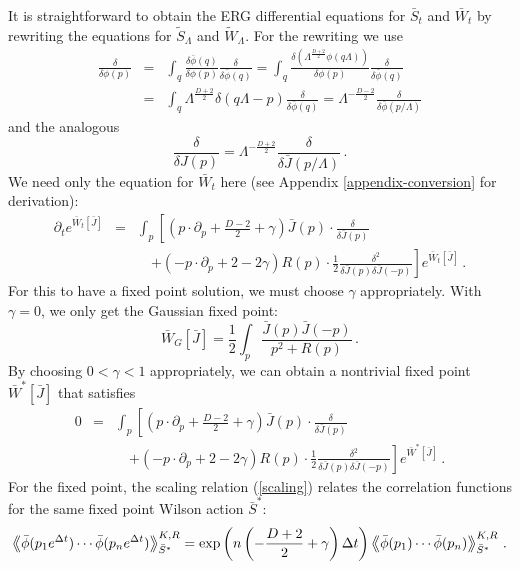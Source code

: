 \documentclass[aps,prd,preprint,groupedaddress,preprintnumbers,longbibliography]{revtex4-1}
\newcommand{\nn}{\nonumber}
\newcommand{\vev}[1]{\left\langle #1 \right\rangle}
\newcommand{\vvev}[1]{\vev{\kern-0.3em\left\langle #1
    \right\rangle\kern-0.3em}}
\begin{document}
It is straightforward to obtain the ERG differential equations for
$\bar{S}_t$ and $\bar{W}_t$ by rewriting the equations for
$\tilde{S}_\Lambda$ and $\tilde{W}_\Lambda$.  For the rewriting we use
\begin{eqnarray}
\frac{\delta}{\delta \phi (p)} 
&=& \int_q \frac{\delta \bar{\phi} (q)}{\delta \phi (p)}
    \frac{\delta}{\delta \bar{\phi} (q)}
= \int_q \frac{\delta \left(\Lambda^{\frac{D+2}{2}} \phi (q
    \Lambda)\right)}{\delta \phi (p)}  \frac{\delta}{\delta \bar{\phi}
    (q)}\nn\\
&=& \int_q \Lambda^{\frac{D+2}{2}} \delta (q \Lambda - p)
\frac{\delta}{\delta \bar{\phi} (q)}
= \Lambda^{- \frac{D-2}{2}} \frac{\delta}{\delta \bar{\phi}
  (p/\Lambda)}
\label{ddphi-ddphibar}
\end{eqnarray}
and the analogous
\begin{equation}
\frac{\delta}{\delta J (p)} = \Lambda^{-\frac{D+2}{2}}
\frac{\delta}{\delta \bar{J} (p/\Lambda)}\,.
\label{ddJ-ddJbar}
\end{equation}
We need only the equation for $\bar{W}_t$ here
(see Appendix \ref{appendix-conversion} for derivation):
\begin{eqnarray}
\partial_t e^{\bar{W}_t [\bar{J}]} &=& \int_p \left[
\left( p \cdot \partial_p + \frac{D-2}{2} + \gamma \right) \bar{J} (p)
\cdot \frac{\delta}{\delta \bar{J} (p)}\right.\nn\\
&&\quad\left. + \left( - p \cdot \partial_p + 2 - 2 \gamma \right)
  R(p) \cdot \frac{1}{2} \frac{\delta^2}{\delta \bar{J} (p) \delta
    \bar{J} (-p)} \right] e^{\bar{W}_t [\bar{J}]}\,.\label{diffusion-dimless}
\end{eqnarray}
For this to have a fixed point solution, we must choose $\gamma$
appropriately. With $\gamma = 0$, we only get the Gaussian fixed point:
\begin{equation}
\bar{W}_G [\bar{J}] = \frac{1}{2} \int_p \frac{\bar{J} (p) \bar{J}
  (-p)}{p^2 + R (p)}\,.
\end{equation}
By choosing $0 < \gamma < 1$ appropriately, we can obtain a nontrivial
fixed point $\bar{W}^* [\bar{J}]$ that satisfies
\begin{eqnarray}
0 &=& \int_p \left[
\left( p \cdot \partial_p + \frac{D-2}{2} + \gamma \right) \bar{J} (p)
\cdot \frac{\delta}{\delta \bar{J} (p)}\right.\nn\\
&&\quad\left. + \left( - p \cdot \partial_p + 2 - 2 \gamma \right)
  R(p) \cdot \frac{1}{2} \frac{\delta^2}{\delta \bar{J} (p) \delta
    \bar{J} (-p)} \right] e^{\bar{W}^* [\bar{J}]}\,.
\label{Wbarstar}
\end{eqnarray}
For the fixed point, the scaling relation (\ref{scaling}) relates the
correlation functions for the same fixed point Wilson action
$\bar{S}^*$:
\begin{equation}
\vvev{\bar{\phi} (p_1 e^{\Delta t}) \cdots \bar{\phi} (p_n e^{\Delta
    t})}_{\bar{S}^*}^{K,R} = \exp \left( n \left(-\frac{D+2}{2} + \gamma
  \right) \Delta t \right) \vvev{\bar{\phi} (p_1) \cdots \bar{\phi}
  (p_n)}_{\bar{S}^*}^{K,R}\,.
\end{equation}
\end{document}

